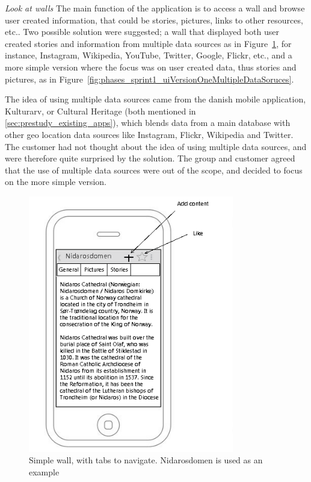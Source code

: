 \documentclass[11pt]{book}
\begin{document}
\textit{Look at walls}
The main function of the application is to access a wall and browse user created information, that could be stories, pictures, links to other resources, etc.. Two possible solution were suggested; a wall that displayed both user created stories and information from multiple data sources as in Figure~\ref{fig:phases_sprint1_uiVersionOneSimpleWall}, for instance, Instagram, Wikipedia, YouTube, Twitter, Google, Flickr, etc., and a more simple version where the focus was on user created data, thus stories and pictures, as in Figure~\ref{fig:phases_sprint1_uiVersionOneMultipleDataSoruces}.

The idea of using multiple data sources came from the danish mobile application, Kulturarv, or Cultural Heritage (both mentioned in \ref{sec:prestudy_existing_apps}), which blends data from a main database with other geo location data sources like Instagram, Flickr, Wikipedia and Twitter. The customer had not thought about the idea of using multiple data sources, and were therefore quite surprised by the solution. The group and customer agreed that the use of multiple data sources were out of the scope, and decided to focus on the more simple version.

\begin{figure}[H]
      \centering
      \includegraphics[width=0.8\textwidth]{Figures/Phases/Sprint1/versiononeSimpleWall.png}
      \caption{Simple wall, with tabs to navigate. Nidarosdomen is used as an example}
      \label{fig:phases_sprint1_uiVersionOneSimpleWall}
\end{figure}
\end{document}
